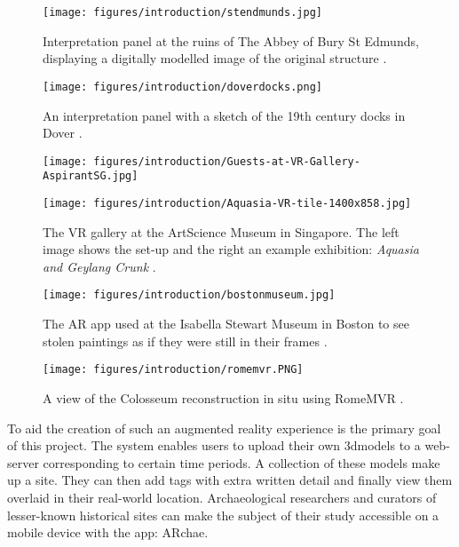 \documentclass[12pt, a4paper]{article}
\begin{document}
\begin{figure}
\centering
    \texttt{[image: figures/introduction/stendmunds.jpg]}
    \caption{Interpretation panel at the ruins of The Abbey of Bury St Edmunds, displaying a digitally modelled image of the original structure \cite{preface:bury}.}
    \label{fig:stedmundschurch}
\end{figure}

\begin{figure}
    \centering
    \texttt{[image: figures/introduction/doverdocks.png]}
    \caption{An interpretation panel with a sketch of the 19th century docks in Dover \cite{preface:dover}.}
    \label{fig:iloveyoubryce}
\end{figure}

\begin{figure}[]
\centering
\begin{minipage}{.5\textwidth}
  \centering
  \texttt{[image: figures/introduction/Guests-at-VR-Gallery-AspirantSG.jpg]}
\end{minipage}%
\begin{minipage}{.5\textwidth}
  \centering
  \texttt{[image: figures/introduction/Aquasia-VR-tile-1400x858.jpg]}
\end{minipage}
\caption{The VR gallery at the ArtScience Museum in Singapore. The left image shows the set-up and the right an example exhibition: \textit{Aquasia and Geylang Crunk} \cite{preface:artscience}.}
\label{fig:singaporeartsci}
\end{figure}

\begin{figure}
    \centering
    \texttt{[image: figures/introduction/bostonmuseum.jpg]}
    \caption{The AR app used at the Isabella Stewart Museum in Boston to see stolen paintings as if they were still in their frames \cite{preface:bostommuseum}.}
    \label{fig:bostonmuseum}
\end{figure}

\begin{figure}
    \centering
    \texttt{[image: figures/introduction/romemvr.PNG]}
    \caption{A view of the Colosseum reconstruction in situ using RomeMVR \cite{existing:romemvr}.}
    \label{fig:romemv2intro}
\end{figure}

To aid the creation of such an augmented reality experience is the primary goal of this project. The system enables users to upload their own \gls{3dmodel}s to a web-server corresponding to certain time periods. A collection of these models make up a site. They can then add tags with extra written detail and finally view them overlaid in their real-world location. Archaeological researchers and curators of lesser-known historical sites can make the subject of their study accessible on a mobile device with the app: ARchae.
\end{document}
